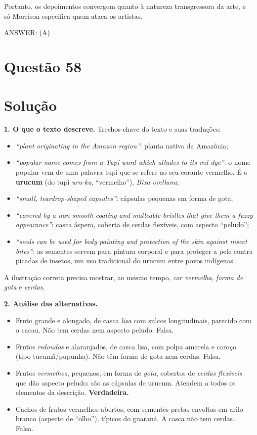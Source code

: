 \documentclass{article}%
\begin{document}
Portanto, os depoimentos convergem quanto à natureza transgressora da arte, e só Morrison especifica quem ataca os artistas.

ANSWER: (A)%
\newpage%
\section*{Questão 58}

\section*{Solução}

\textbf{1. O que o texto descreve.} Trechos-chave do texto e suas traduções:
\begin{itemize}
  \item \emph{``plant originating in the Amazon region''}: planta nativa da Amazônia;
  \item \emph{``popular name comes from a Tupi word which alludes to its red dye''}: o nome popular vem de uma palavra tupi que se refere ao seu corante vermelho. É o \textbf{urucum} (do tupi \emph{uru-ku}, ``vermelho''), \emph{Bixa orellana};
  \item \emph{``small, teardrop-shaped capsules''}: cápsulas pequenas em forma de gota;
  \item \emph{``covered by a non-smooth coating and malleable bristles that give them a fuzzy appearance''}: casca áspera, coberta de cerdas flexíveis, com aspecto ``peludo'';
  \item \emph{``seeds can be used for body painting and protection of the skin against insect bites''}: as sementes servem para pintura corporal e para proteger a pele contra picadas de insetos, um uso tradicional do urucum entre povos indígenas.
\end{itemize}
A ilustração correta precisa mostrar, ao mesmo tempo, \emph{cor vermelha}, \emph{forma de gota} e \emph{cerdas}.

\textbf{2. Análise das alternativas.}
\begin{itemize}
  \item[a)] Fruto grande e alongado, de casca \emph{lisa} com sulcos longitudinais, parecido com o cacau. Não tem cerdas nem aspecto peludo. Falsa.
  \item[b)] Frutos \emph{redondos} e alaranjados, de casca lisa, com polpa amarela e caroço (tipo tucumã/pupunha). Não têm forma de gota nem cerdas. Falsa.
  \item[c)] Frutos \emph{vermelhos}, pequenos, em forma de \emph{gota}, cobertos de \emph{cerdas flexíveis} que dão aspecto peludo: são as cápsulas de urucum. Atendem a todos os elementos da descrição. \textbf{Verdadeira.}
  \item[d)] Cachos de frutos vermelhos abertos, com sementes pretas envoltas em arilo branco (aspecto de ``olho''), típicos do guaraná. A casca não tem cerdas. Falsa.
\end{itemize}
\end{document}

